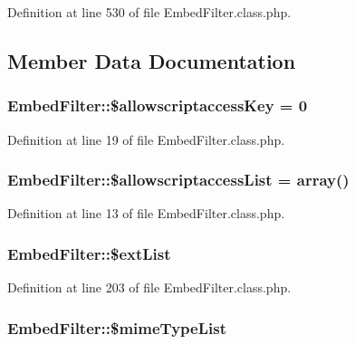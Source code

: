 Definition at line 530 of file Embed\+Filter.\+class.\+php.



\subsection{Member Data Documentation}
\hypertarget{classEmbedFilter_a643732fe7a32d323e2123bd1ef9f3bdb}{
\subsubsection[{\$allowscriptaccess\+Key}]{\setlength{\rightskip}{0pt plus 5cm}Embed\+Filter\+::\$allowscriptaccess\+Key = 0}}\label{classEmbedFilter_a643732fe7a32d323e2123bd1ef9f3bdb}


Definition at line 19 of file Embed\+Filter.\+class.\+php.

\hypertarget{classEmbedFilter_a09ba67f124ae7f35412a1bb11f2419c7}{
\subsubsection[{\$allowscriptaccess\+List}]{\setlength{\rightskip}{0pt plus 5cm}Embed\+Filter\+::\$allowscriptaccess\+List = array()}}\label{classEmbedFilter_a09ba67f124ae7f35412a1bb11f2419c7}


Definition at line 13 of file Embed\+Filter.\+class.\+php.

\hypertarget{classEmbedFilter_ae4ef00ed26254ca247a83d91b021a928}{
\subsubsection[{\$ext\+List}]{\setlength{\rightskip}{0pt plus 5cm}Embed\+Filter\+::\$ext\+List}}\label{classEmbedFilter_ae4ef00ed26254ca247a83d91b021a928}


Definition at line 203 of file Embed\+Filter.\+class.\+php.

\hypertarget{classEmbedFilter_a6bbd35ce27aaa1eda9600f8ee78b9b34}{
\subsubsection[{\$mime\+Type\+List}]{\setlength{\rightskip}{0pt plus 5cm}Embed\+Filter\+::\$mime\+Type\+List}}\label{classEmbedFilter_a6bbd35ce27aaa1eda9600f8ee78b9b34}


